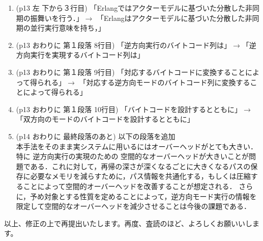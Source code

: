 \documentclass[a4j]{jarticle}
\begin{document}
\begin{enumerate}
\item (p13 左 下から３行目) 「Erlangではアクターモデルに基づいた分散した非同期の振舞いを行う．」$\rightarrow$
「Erlangはアクターモデルに基づいた分散した非同期の並行実行意味を持ち，」
\item (p13 おわりに 第１段落 8行目) 「逆方向実行のバイトコード列は」$\rightarrow$「逆方向実行を実現するバイトコード列は」
\item (p13 おわりに 第１段落 9行目) 「対応するバイトコードに変換することによって得られる」$\rightarrow$
「対応する逆方向モードのバイトコード列に変換することによって得られる」
\item (p13 おわりに 第１段落 10行目) 「バイトコードを設計するとともに」$\rightarrow$「双方向のモードのバイトコードを設計するとともに」
\item (p14 おわりに 最終段落のあと) 以下の段落を追加\\

本手法をそのまま実システムに用いるにはオーバーヘッドがとても大きい．
特に%
逆方向実行の実現のための%
空間的なオーバーヘッドが大きいことが問題である．これに対して，再帰の深さが深くなるごとに大きくなるパスの保存に必要なメモリを減らすために，パス情報を共通化する，もしくは圧縮することによって空間的オーバーヘッドを改善することが想定される．
さらに，予め対象とする性質を定めることによって，逆方向モード実行の情報を
限定して空間的なオーバーヘッドを減少させることは今後の課題である．

\end{enumerate}

以上、修正の上で再提出いたします。再度、査読のほど、よろしくお願いいします。
\end{document}
